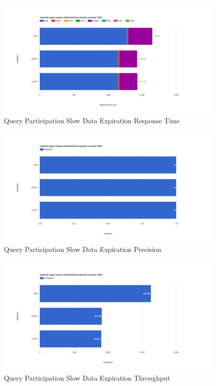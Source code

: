\begin{figure}[!htbp]
	\centering
    \includegraphics[width=6.5in]{img/app3-qp-slow-r.png}
    \caption{Query Participation Slow Data Expiration Response Time}
\end{figure}
\begin{figure}[!htbp]
	\centering
    \includegraphics[width=6.5in]{img/app3-qp-slow-p.png}
    \caption{Query Participation Slow Data Expiration Precision}
\end{figure}
\begin{figure}[!htbp]
	\centering
    \includegraphics[width=6.5in]{img/app3-qp-slow-t.png}
    \caption{Query Participation Slow Data Expiration Throughput}
\end{figure}
